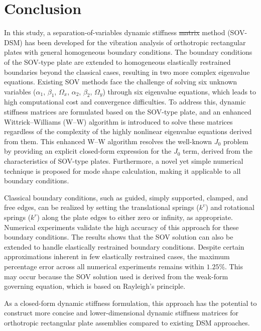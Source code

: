 \documentclass[preprint,12pt,number]{elsarticle}
\providecommand{\DIFaddtex}[1]{{\protect\color{blue}\uwave{#1}}} %
\providecommand{\DIFdeltex}[1]{{\protect\color{red}\sout{#1}}}                      %
\providecommand{\DIFaddbegin}{} %
\providecommand{\DIFaddend}{} %
\providecommand{\DIFdelbegin}{} %
\providecommand{\DIFdelend}{} %
\providecommand{\DIFadd}[1]{\texorpdfstring{\DIFaddtex{#1}}{#1}} %
\providecommand{\DIFdel}[1]{\texorpdfstring{\DIFdeltex{#1}}{}} %
\newcommand{\DIFscaledelfig}{0.5}
\newlength{\DIFdelgraphicswidth} %
\newlength{\DIFdelgraphicsheight} %
\newcommand{\DIFaddincludegraphics}[2][]{{\color{blue}\fbox{\DIFOincludegraphics[#1]{#2}}}} %
\newcommand{\DIFdelincludegraphics}[2][]{%
\sbox{\DIFdelgraphicsbox}{\DIFOincludegraphics[#1]{#2}}%
\settoboxwidth{\DIFdelgraphicswidth}{\DIFdelgraphicsbox} %
\settoboxtotalheight{\DIFdelgraphicsheight}{\DIFdelgraphicsbox} %
\scalebox{\DIFscaledelfig}{%
\parbox[b]{\DIFdelgraphicswidth}{\usebox{\DIFdelgraphicsbox}\\[-\baselineskip] \rule{\DIFdelgraphicswidth}{0em}}\llap{\resizebox{\DIFdelgraphicswidth}{\DIFdelgraphicsheight}{%
\setlength{\unitlength}{\DIFdelgraphicswidth}%
\begin{picture}(1,1)%
\thicklines\linethickness{2pt} %
{\color[rgb]{1,0,0}\put(0,0){\framebox(1,1){}}}%
{\color[rgb]{1,0,0}\put(0,0){\line( 1,1){1}}}%
{\color[rgb]{1,0,0}\put(0,1){\line(1,-1){1}}}%
\end{picture}%
}\hspace*{3pt}}} %
} %
\DeclareRobustCommand{\DIFaddbegin}{\DIFOaddbegin \let\includegraphics\DIFaddincludegraphics} %
\DeclareRobustCommand{\DIFaddend}{\DIFOaddend \let\includegraphics\DIFOincludegraphics} %
\DeclareRobustCommand{\DIFdelbegin}{\DIFOdelbegin \let\includegraphics\DIFdelincludegraphics} %
\DeclareRobustCommand{\DIFdelend}{\DIFOaddend \let\includegraphics\DIFOincludegraphics} %
\begin{document}
\section{Conclusion}\label{sec:coclusion}
In this study, a separation-of-variables dynamic stiffness \DIFdelbegin \DIFdel{matrix }\DIFdelend method (SOV-DSM) has been developed for the vibration analysis of orthotropic rectangular plates with general homogeneous boundary conditions. 
The boundary conditions of the SOV-type plate are extended to homogeneous elastically restrained boundaries beyond the classical cases, resulting in two more complex eigenvalue equations. 
Existing SOV methods face the challenge of solving six unknown variables ($\alpha_1$, $\beta_1$, $\Omega_x$, $\alpha_2$, $\beta_2$, $\Omega_y$) through six eigenvalue equations, which leads to high computational cost and convergence difficulties. 
To address this, dynamic stiffness matrices are formulated based on the \DIFaddbegin \DIFadd{extended }\DIFaddend SOV-type plate, and an enhanced Wittrick–Williams (W–W) algorithm is introduced to solve these matrices regardless of the complexity of the highly nonlinear eigenvalue equations derived from them. 
This enhanced W–W algorithm resolves the well-known $J_0$ problem by providing an explicit closed-form expression for the $J_0$ term, derived from the characteristics of SOV-type plates. 
Furthermore, a novel yet simple numerical technique is proposed for mode shape calculation, making it applicable to all boundary conditions.

Classical boundary conditions, such as guided, simply supported, clamped, and free edges, can be realized by setting the translational springs (\DIFdelbegin \DIFdel{$k^v$}\DIFdelend \DIFaddbegin \DIFadd{$k^v_{\xi}$, $k^v_{\eta}$}\DIFaddend ) and rotational springs (\DIFdelbegin \DIFdel{$k^r$}\DIFdelend \DIFaddbegin \DIFadd{$k^r_{\xi}$, $k^r_{\eta}$}\DIFaddend ) along the plate edges to either zero or infinity, as appropriate.  
Numerical experiments validate the high accuracy of this approach for these boundary conditions.  
The results shows that the SOV solution can also be extended to handle elastically restrained boundary conditions.
Despite certain approximations inherent in few elastically restrained cases, the maximum percentage error across all numerical experiments remains within $1.25\%$. 
This may occur because the SOV solution used is derived from the weak-form governing equation, which is based on Rayleigh's principle.  

As a closed-form dynamic stiffness formulation, this approach has the potential to construct more concise and lower-dimensional dynamic stiffness matrices for orthotropic rectangular plate assemblies compared to existing DSM approaches.
\end{document}
